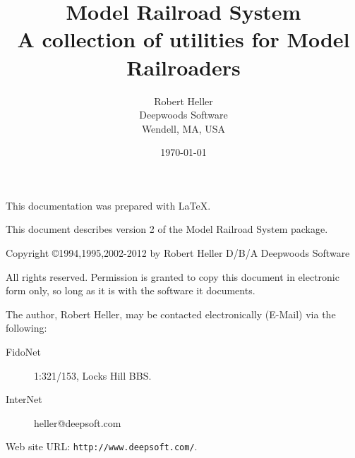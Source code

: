 \title{Model Railroad System \\ A collection of utilities for Model Railroaders\\ \MRRSubTitle}
\author{Robert Heller \\ Deepwoods Software \\ Wendell, MA, USA}
\date{\today}
\begin{titlepage}

\maketitle


\clearpage


This documentation was prepared with \LaTeX.

This document describes version 2 of the Model Railroad System package.

\vspace{.25in}



{\small Copyright \copyright 1994,1995,2002-2012 by Robert Heller D/B/A Deepwoods
Software}

\vspace{.25in}

All rights reserved.  Permission is granted to copy this document in
electronic form only, so long as it is with the software it
documents. 

The author, Robert Heller, may be contacted electronically (E-Mail) via
the following:

\begin{description}
\item[FidoNet] 1:321/153, Locks Hill BBS.
\item[InterNet] heller@deepsoft.com
\end{description}

Web site URL: {\tt http://www.deepsoft.com/}.

\thispagestyle{empty}
\setcounter{page}{0}
\clearpage

\end{titlepage}

